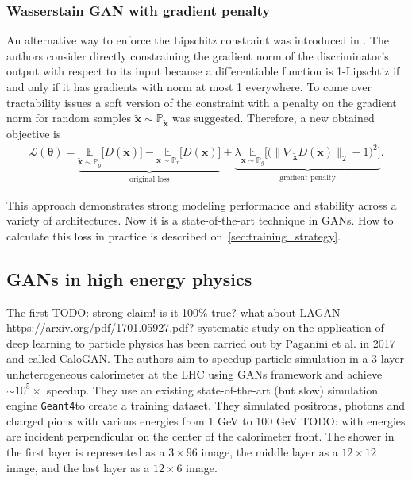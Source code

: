 \documentclass{webofc}
\newcommand{\vx}{\ensuremath{\mathbf{x}}}
\newcommand{\todo}[1]{{\color{blue}TODO: #1}}
\newcommand{\geant}{{\texttt{Geant4}}}
\begin{document}
\subsubsection{Wasserstain GAN with gradient penalty}
An alternative way to enforce the Lipschitz constraint was introduced in \cite{gulrajani2017improved}. The authors consider directly constraining the gradient norm of the discriminator's output with respect to its input because a differentiable function is 1-Lipschtiz if and only if it has gradients with norm at most 1 everywhere. To come over tractability issues a soft version of the constraint with a penalty on the gradient norm for random samples $\tilde{\vx} \sim \mathbb{P}_{\tilde{\vx}}$ was suggested. Therefore, a new obtained objective is 
\begin{equation} \label{gpwgan-loss}
\begin{gathered}
\mathcal{L}(\bm{\theta}) =
\underbrace{ \underset{\tilde{\vx} \sim \mathbb{P}_g}{\mathbb{E}}  \Big[D(\tilde{\vx})\Big] - \underset{\vx \sim \mathbb{P}_r}{\mathbb{E}} \Big[D(\vx)\Big]}_{\text{original loss}} + 
\underbrace{ \lambda \underset{\vx \sim \mathbb{P}_g}{\mathbb{E}} \Big[\big(\|\nabla_{\tilde{\vx}} D(\tilde{\vx})\|_2 - 1\big)^2 \Big]}_{\text{gradient penalty}}.
\end{gathered}
\end{equation}

This approach demonstrates strong modeling performance and stability across a variety of architectures.  Now it is a state-of-the-art technique in GANs. 
How to calculate this loss in practice is described on~\cref{sec:training_strategy}.

\subsection{GANs in high energy physics}
The first \todo{strong claim! is it 100\% true? what about LAGAN https://arxiv.org/pdf/1701.05927.pdf?} systematic study on the application of deep learning to particle physics has been carried out by Paganini et al. in 2017 \cite{paganini2017calogan} and called CaloGAN. The authors aim to speedup particle simulation in a 3-layer unheterogeneous calorimeter at the LHC using GANs framework and achieve $\sim 10^5 \times$ speedup. They use an existing state-of-the-art (but slow) simulation engine \geant to create a training dataset. They simulated positrons, photons and charged pions with various energies from 1 GeV to 100 GeV \todo{with energies are incident perpendicular on the center of the calorimeter front}. The shower in the first layer is represented as a $3 \times 96$ image, the middle layer as a $12 \times 12$ image, and the last layer as a $12 \times 6$ image. 
\end{document}
